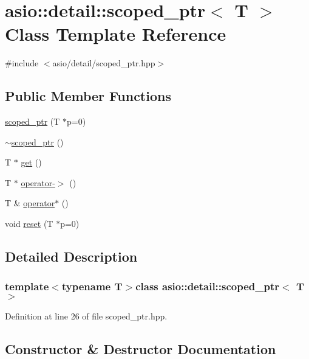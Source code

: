 \hypertarget{classasio_1_1detail_1_1scoped__ptr}{}\section{asio\+:\+:detail\+:\+:scoped\+\_\+ptr$<$ T $>$ Class Template Reference}
\label{classasio_1_1detail_1_1scoped__ptr}


{\ttfamily \#include $<$asio/detail/scoped\+\_\+ptr.\+hpp$>$}

\subsection*{Public Member Functions}
\begin{DoxyCompactItemize}
\item 
\hyperlink{classasio_1_1detail_1_1scoped__ptr_ac296cd97c188e637d6a4343c00c7bc02}{scoped\+\_\+ptr} (T $\ast$p=0)
\item 
\hyperlink{classasio_1_1detail_1_1scoped__ptr_a362b8123d0eb893a7214f67b469a244d}{$\sim$scoped\+\_\+ptr} ()
\item 
T $\ast$ \hyperlink{classasio_1_1detail_1_1scoped__ptr_a11a649c902e6c1cbbd826946f16a280a}{get} ()
\item 
T $\ast$ \hyperlink{classasio_1_1detail_1_1scoped__ptr_a8c28ca9ba1cbcb66b24c9448042731be}{operator-\/$>$} ()
\item 
T \& \hyperlink{classasio_1_1detail_1_1scoped__ptr_ab45eac24352e57daee96d60ee77262d1}{operator$\ast$} ()
\item 
void \hyperlink{classasio_1_1detail_1_1scoped__ptr_a24acf1ea6d44cd9a4aaf2785e513b1e8}{reset} (T $\ast$p=0)
\end{DoxyCompactItemize}


\subsection{Detailed Description}
\subsubsection*{template$<$typename T$>$class asio\+::detail\+::scoped\+\_\+ptr$<$ T $>$}



Definition at line 26 of file scoped\+\_\+ptr.\+hpp.



\subsection{Constructor \& Destructor Documentation}
\hypertarget{classasio_1_1detail_1_1scoped__ptr_ac296cd97c188e637d6a4343c00c7bc02}{}
